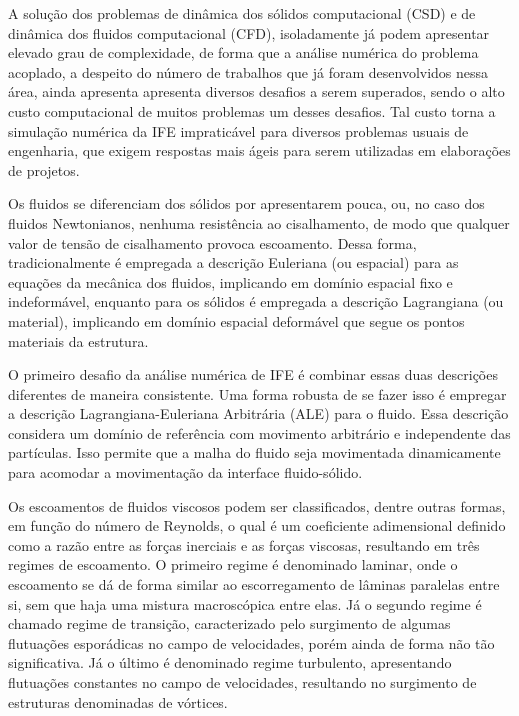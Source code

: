 A solução dos problemas de dinâmica dos sólidos computacional (CSD) e de dinâmica dos fluidos computacional (CFD), isoladamente já podem apresentar elevado grau de complexidade, de forma que a análise numérica do problema acoplado, a despeito do número de trabalhos que já foram desenvolvidos nessa área, ainda apresenta apresenta diversos desafios a serem superados, sendo o alto custo computacional de muitos problemas um desses desafios. Tal custo torna a simulação numérica da IFE impraticável para diversos problemas usuais de engenharia, que exigem respostas mais ágeis para serem utilizadas em elaborações de projetos.
 
Os fluidos se diferenciam dos sólidos por apresentarem pouca, ou, no caso dos fluidos Newtonianos, nenhuma resistência ao cisalhamento, de modo que qualquer valor de tensão de cisalhamento provoca escoamento. Dessa forma, tradicionalmente é empregada a descrição Euleriana (ou espacial) para as equações da mecânica dos fluidos, implicando em domínio espacial fixo e indeformável, enquanto para os sólidos é empregada a descrição Lagrangiana (ou material), implicando em domínio espacial deformável que segue os pontos materiais da estrutura.

O primeiro desafio da análise numérica de IFE é combinar essas duas descrições diferentes de maneira consistente. Uma forma robusta de se fazer isso é empregar a descrição Lagrangiana-Euleriana Arbitrária (ALE) \cite{donea1982arbitrary} para o fluido. Essa descrição considera um domínio de referência com movimento arbitrário e independente das partículas. Isso permite que a malha do fluido seja movimentada dinamicamente para acomodar a movimentação da interface fluido-sólido.

Os escoamentos de fluidos viscosos podem ser classificados, dentre outras formas, em função do número de Reynolds, o qual é um coeficiente adimensional definido como a razão entre as forças inerciais e as forças viscosas, resultando em três regimes de escoamento. O primeiro regime é denominado laminar, onde o escoamento se dá de forma similar ao escorregamento de lâminas paralelas entre si, sem que haja uma mistura macroscópica entre elas. Já o segundo regime é chamado regime de transição, caracterizado pelo surgimento de algumas flutuações esporádicas no campo de velocidades, porém ainda de forma não tão significativa. Já o último é denominado regime turbulento, apresentando flutuações constantes no campo de velocidades, resultando no surgimento de estruturas denominadas de vórtices.

